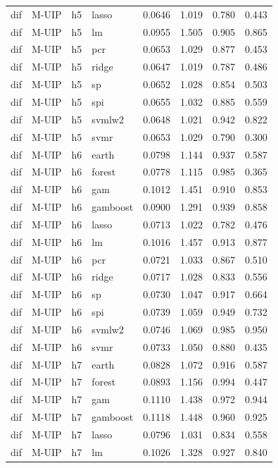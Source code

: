 \begin{ThreePartTable}
\begin{longtable}[t]{llclcccc}
dif & M-UIP & h5 & lasso & 0.0646 & 1.019 & 0.780 & 0.443\\
dif & M-UIP & h5 & lm & 0.0955 & 1.505 & 0.905 & 0.865\\
dif & M-UIP & h5 & pcr & 0.0653 & 1.029 & 0.877 & 0.453\\
dif & M-UIP & h5 & ridge & 0.0647 & 1.019 & 0.787 & 0.486\\
dif & M-UIP & h5 & sp & 0.0652 & 1.028 & 0.854 & 0.503\\
dif & M-UIP & h5 & spi & 0.0655 & 1.032 & 0.885 & 0.559\\
dif & M-UIP & h5 & svmlw2 & 0.0648 & 1.021 & 0.942 & 0.822\\
dif & M-UIP & h5 & svmr & 0.0653 & 1.029 & 0.790 & 0.300\\
\addlinespace
dif & M-UIP & h6 & earth & 0.0798 & 1.144 & 0.937 & 0.587\\
dif & M-UIP & h6 & forest & 0.0778 & 1.115 & 0.985 & 0.365\\
dif & M-UIP & h6 & gam & 0.1012 & 1.451 & 0.910 & 0.853\\
dif & M-UIP & h6 & gamboost & 0.0900 & 1.291 & 0.939 & 0.858\\
dif & M-UIP & h6 & lasso & 0.0713 & 1.022 & 0.782 & 0.476\\
dif & M-UIP & h6 & lm & 0.1016 & 1.457 & 0.913 & 0.877\\
dif & M-UIP & h6 & pcr & 0.0721 & 1.033 & 0.867 & 0.510\\
dif & M-UIP & h6 & ridge & 0.0717 & 1.028 & 0.833 & 0.556\\
dif & M-UIP & h6 & sp & 0.0730 & 1.047 & 0.917 & 0.664\\
dif & M-UIP & h6 & spi & 0.0739 & 1.059 & 0.949 & 0.732\\
dif & M-UIP & h6 & svmlw2 & 0.0746 & 1.069 & 0.985 & 0.950\\
dif & M-UIP & h6 & svmr & 0.0733 & 1.050 & 0.880 & 0.435\\
\addlinespace
dif & M-UIP & h7 & earth & 0.0828 & 1.072 & 0.916 & 0.587\\
dif & M-UIP & h7 & forest & 0.0893 & 1.156 & 0.994 & 0.447\\
dif & M-UIP & h7 & gam & 0.1110 & 1.438 & 0.972 & 0.944\\
dif & M-UIP & h7 & gamboost & 0.1118 & 1.448 & 0.960 & 0.925\\
dif & M-UIP & h7 & lasso & 0.0796 & 1.031 & 0.834 & 0.558\\
dif & M-UIP & h7 & lm & 0.1026 & 1.328 & 0.927 & 0.840\\

\end{longtable}
\end{ThreePartTable}
